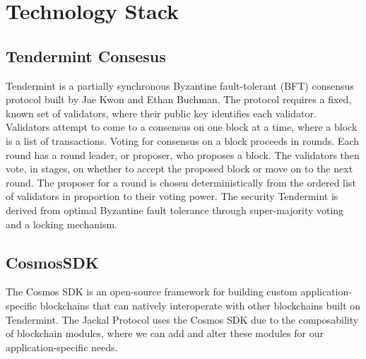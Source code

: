 \documentclass[a4paper]{article}
\begin{document}
\section{Technology Stack}
\subsection{Tendermint Consesus}
Tendermint is a partially synchronous Byzantine fault-tolerant (BFT) consensus protocol built by Jae Kwon and Ethan Buchman. The protocol requires a fixed, known set of validators, where their public key identifies each validator. Validators attempt to come to a consensus on one block at a time, where a block is a list of transactions. Voting for consensus on a block proceeds in rounds. Each round has a round leader, or proposer, who proposes a block. The validators then vote, in stages, on whether to accept the proposed block or move on to the next round. The proposer for a round is chosen deterministically from the ordered list of validators in proportion to their voting power. The security Tendermint is derived from optimal Byzantine fault tolerance through super-majority voting and a locking mechanism. \cite{tendermint}
\subsection{CosmosSDK}
The Cosmos SDK is an open-source framework for building custom application-specific blockchains that can natively interoperate with other blockchains built on Tendermint. The Jackal Protocol uses the Cosmos SDK due to the composability of blockchain modules, where we can add and alter these modules for our application-specific needs. \cite{cosmossdk}
\end{document}
